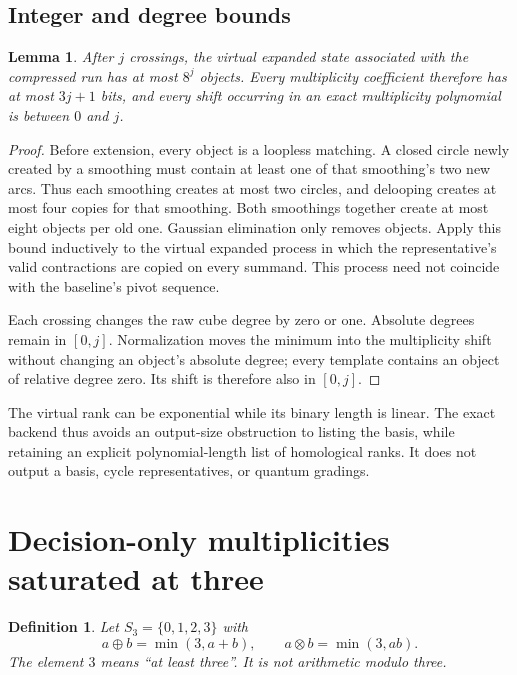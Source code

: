 \documentclass[11pt,letterpaper]{article}
\newtheorem{lemma}[theorem]{Lemma}
\newtheorem{definition}[theorem]{Definition}
\begin{document}
\subsection{Integer and degree bounds}
\begin{lemma}\label{lem:weightbits}
After $j$ crossings, the virtual expanded state associated with the
compressed run has at most $8^j$ objects. Every multiplicity coefficient
therefore has at most $3j+1$ bits, and every shift occurring in an exact
multiplicity polynomial is between $0$ and $j$.
\end{lemma}
\begin{proof}
Before extension, every object is a loopless matching. A closed circle newly
created by a smoothing must contain at least one of that smoothing's two
new arcs. Thus each smoothing creates at most two circles, and delooping
creates at most four copies for that smoothing. Both smoothings together
create at most eight objects per old one. Gaussian elimination only removes
objects. Apply this bound inductively to the virtual expanded process in
which the representative's valid contractions are copied on every summand.
This process need not coincide with the baseline's pivot sequence.

Each crossing changes the raw cube degree by zero or one. Absolute degrees
remain in $[0,j]$. Normalization moves the minimum into the multiplicity
shift without changing an object's absolute degree; every template contains
an object of relative degree zero. Its shift is therefore also in $[0,j]$.
\end{proof}

The virtual rank can be exponential while its binary length is linear.
The exact backend thus avoids an output-size obstruction to listing the
basis, while retaining an explicit polynomial-length list of homological
ranks. It does not output a basis, cycle representatives, or quantum gradings.

\section{Decision-only multiplicities saturated at three}
\label{sec:saturation}

\begin{definition}
Let $S_3=\{0,1,2,3\}$ with
\[
 a\oplus b=\min(3,a+b),\qquad
 a\otimes b=\min(3,ab).
\]
The element $3$ means ``at least three''. It is not arithmetic modulo three.
\end{definition}
\end{document}
